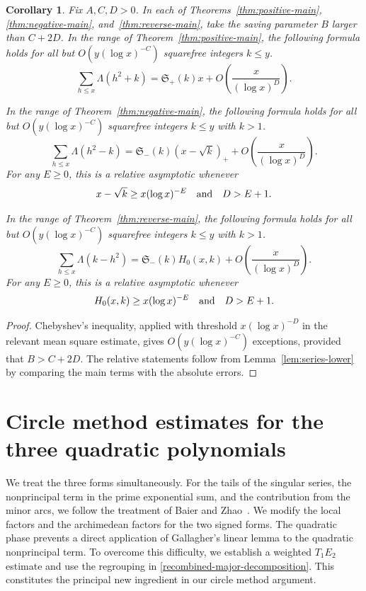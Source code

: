 \documentclass[12pt,reqno]{amsart}
\numberwithin{equation}{section}
\theoremstyle{plain}
\newtheorem{corollary}[theorem]{Corollary}
\theoremstyle{remark}
\begin{document}
\begin{corollary}\label{cor:pointwise}
Fix $A,C,D>0$.  In each of Theorems~\ref{thm:positive-main},
\ref{thm:negative-main}, and~\ref{thm:reverse-main}, take the saving
parameter $B$ larger than $C+2D$.
In the range of Theorem~\ref{thm:positive-main}, the following formula
holds for all but $O(y(\log x)^{-C})$ squarefree integers $k\leq y$.
\begin{equation}\label{positive-absolute-corollary}
 \sum_{h\leq x}\Lambda(h^2+k)
 =\mathfrak S_+(k)x
 +O\left(\frac{x}{(\log x)^D}\right).
\end{equation}

In the range of Theorem~\ref{thm:negative-main}, the following formula
holds for all but $O(y(\log x)^{-C})$ squarefree integers $k\leq y$
with $k>1$.
\begin{equation}\label{negative-absolute-corollary}
 \sum_{h\leq x}\Lambda(h^2-k)
 =\mathfrak S_-(k)(x-\sqrt{k})_+
+O\left(\frac{x}{(\log x)^D}\right).
\end{equation}
For any $E\geq 0$, this is a relative asymptotic whenever
\[
x-\sqrt{k}\geq x(\log x)^{-E}
\quad\hbox{and}\quad D>E+1.
\]

In the range of Theorem~\ref{thm:reverse-main}, the following formula
holds for all but $O(y(\log x)^{-C})$ squarefree integers $k\leq y$
with $k>1$.
\begin{equation}\label{reverse-absolute-corollary}
 \sum_{h\leq x}\Lambda(k-h^2)
 =\mathfrak S_-(k)H_0(x,k)
+O\left(\frac{x}{(\log x)^D}\right).
\end{equation}
For any $E\geq 0$, this is a relative asymptotic whenever
\[
H_0(x,k)\geq x(\log x)^{-E}
\quad\hbox{and}\quad D>E+1.
\]
\end{corollary}

\begin{proof}
Chebyshev's inequality, applied with threshold $x(\log x)^{-D}$ in the relevant mean square estimate, gives
$O(y(\log x)^{-C})$ exceptions, provided that $B>C+2D$. The relative statements follow from
Lemma~\ref{lem:series-lower} by comparing the main terms with the
absolute errors.
\end{proof}

\section{Circle method estimates for the three quadratic polynomials}
\label{sec:negative}

We treat the three forms simultaneously.  For the tails of the
singular series, the nonprincipal term in the prime exponential sum,
and the contribution from the minor arcs, we follow the treatment
of Baier and Zhao~\cite{BaierZhao2007}.  We modify the local factors and the
archimedean factors for the two signed forms.  The quadratic phase prevents a direct application of  Gallagher's linear lemma to the quadratic
nonprincipal term.  To overcome this difficulty, we establish a weighted $T_1E_2$
estimate and use the regrouping in
\eqref{recombined-major-decomposition}.  This constitutes the principal new ingredient in
our circle method argument.
\end{document}
